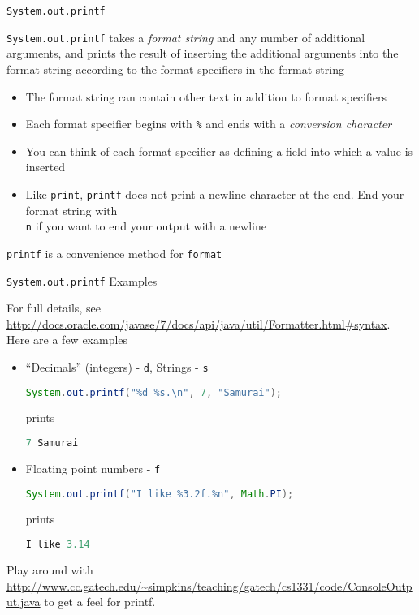 \documentclass{beamer}
\begin{document}
\begin{frame}[fragile]{{\tt System.out.printf}}


{\tt System.out.printf} takes a {\it format string} and any number of additional arguments, and prints the result of inserting the additional arguments into the format string according to the format specifiers in the format string
\begin{itemize}
\item The format string can contain other text in addition to format specifiers
\item Each format specifier begins with {\tt \%} and ends with a {\it conversion character}
\item You can think of each format specifier as defining a field into which a value is inserted
\item Like {\tt print}, {\tt printf} does not print a newline character at the end.  End your format string with {\tt \\n} if you want to end your output with a newline
\end{itemize}
 {\tt printf} is a convenience method for {\tt format}
\end{frame}

\begin{frame}[fragile]{{\tt System.out.printf} Examples}


For full details, see \url{http://docs.oracle.com/javase/7/docs/api/java/util/Formatter.html#syntax}.  Here are a few examples
\begin{itemize}

\item ``Decimals'' (integers) - {\tt d}, Strings - {\tt s}
\begin{lstlisting}[language=Java]
System.out.printf("%d %s.\n", 7, "Samurai");
\end{lstlisting}
prints
\begin{lstlisting}[language=Java]
7 Samurai
\end{lstlisting}

\item Floating point numbers - {\tt f}
\begin{lstlisting}[language=Java]
 System.out.printf("I like %3.2f.%n", Math.PI);
\end{lstlisting}
prints
\begin{lstlisting}[language=Java]
I like 3.14
\end{lstlisting}

\end{itemize}

Play around with \url{http://www.cc.gatech.edu/~simpkins/teaching/gatech/cs1331/code/ConsoleOutput.java} to get a feel for printf.

\end{frame}
\end{document}
